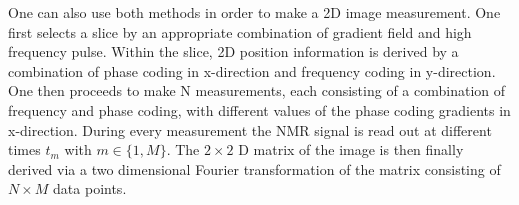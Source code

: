 One can also use both methods in order to make a 2D image measurement. One first selects a slice by an appropriate combination of gradient field and high frequency pulse. Within the slice, 2D position information is derived by a combination of phase coding in x-direction and frequency coding in y-direction. One then proceeds to make N measurements, each consisting of a combination of frequency and phase coding, with different values of the phase coding gradients in x-direction. During every measurement the NMR signal is read out at different times $t_m$ with $m \in \{1,M\}$. The $2\times2$ D matrix of the image is then finally derived via a two dimensional Fourier transformation of the matrix consisting of $N\times M$ data points.\cite{manual} \cite{ernst1987principles}